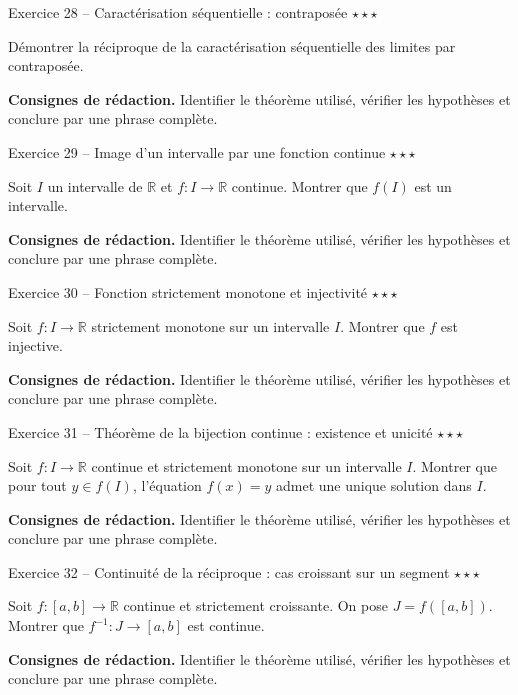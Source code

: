 \documentclass[11pt,a4paper]{article}
\newcommand{\etoiles}[1]{\hfill\textcolor{orangeprepa}{\textbf{#1}}}
\newcommand{\R}{\mathbb{R}}
\begin{document}
\begin{exobox}{Exercice 28 -- Caractérisation séquentielle : contraposée \etoiles{$\star\star\star$}}

Démontrer la réciproque de la caractérisation séquentielle des limites par contraposée.

\medskip
\textbf{Consignes de rédaction.} Identifier le théorème utilisé, vérifier les hypothèses et conclure par une phrase complète.
\end{exobox}


\begin{exobox}{Exercice 29 -- Image d'un intervalle par une fonction continue \etoiles{$\star\star\star$}}

Soit $I$ un intervalle de $\R$ et $f:I\to\R$ continue. Montrer que $f(I)$ est un intervalle.

\medskip
\textbf{Consignes de rédaction.} Identifier le théorème utilisé, vérifier les hypothèses et conclure par une phrase complète.
\end{exobox}


\begin{exobox}{Exercice 30 -- Fonction strictement monotone et injectivité \etoiles{$\star\star\star$}}

Soit $f:I\to\R$ strictement monotone sur un intervalle $I$. Montrer que $f$ est injective.

\medskip
\textbf{Consignes de rédaction.} Identifier le théorème utilisé, vérifier les hypothèses et conclure par une phrase complète.
\end{exobox}


\begin{exobox}{Exercice 31 -- Théorème de la bijection continue : existence et unicité \etoiles{$\star\star\star$}}

Soit $f:I\to\R$ continue et strictement monotone sur un intervalle $I$. Montrer que pour tout $y\in f(I)$, l'équation $f(x)=y$ admet une unique solution dans $I$.

\medskip
\textbf{Consignes de rédaction.} Identifier le théorème utilisé, vérifier les hypothèses et conclure par une phrase complète.
\end{exobox}


\begin{exobox}{Exercice 32 -- Continuité de la réciproque : cas croissant sur un segment \etoiles{$\star\star\star$}}

Soit $f:[a,b]\to\R$ continue et strictement croissante. On pose $J=f([a,b])$. Montrer que $f^{-1}:J\to[a,b]$ est continue.

\medskip
\textbf{Consignes de rédaction.} Identifier le théorème utilisé, vérifier les hypothèses et conclure par une phrase complète.
\end{exobox}
\end{document}
